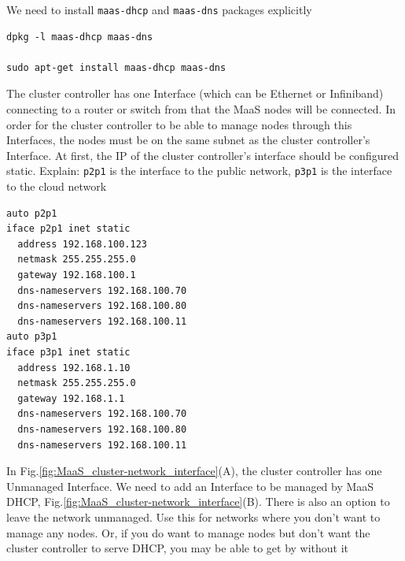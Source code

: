 We need to install \verb!maas-dhcp! and \verb!maas-dns! packages
explicitly
\begin{verbatim}
dpkg -l maas-dhcp maas-dns

sudo apt-get install maas-dhcp maas-dns
\end{verbatim}
The cluster controller has one Interface (which can be Ethernet or Infiniband)
connecting to a router or switch from that the MaaS nodes will be connected. In
order for the cluster controller to be able to manage nodes through this
Interfaces, the nodes must be on the same subnet as the cluster controller's
Interface. At first, the IP of the cluster controller's interface should be
configured static. Explain: \verb!p2p1! is the interface to the public network,
\verb!p3p1! is the interface to the cloud network 
\begin{verbatim}
auto p2p1
iface p2p1 inet static
  address 192.168.100.123
  netmask 255.255.255.0
  gateway 192.168.100.1
  dns-nameservers 192.168.100.70
  dns-nameservers 192.168.100.80
  dns-nameservers 192.168.100.11
auto p3p1
iface p3p1 inet static
  address 192.168.1.10
  netmask 255.255.255.0
  gateway 192.168.1.1
  dns-nameservers 192.168.100.70
  dns-nameservers 192.168.100.80
  dns-nameservers 192.168.100.11
\end{verbatim}

In Fig.\ref{fig:MaaS_cluster-network_interface}(A), the cluster controller has
one Unmanaged Interface. We need to add an Interface to be managed by MaaS
DHCP, Fig.\ref{fig:MaaS_cluster-network_interface}(B).
There is also an option to leave the network unmanaged. Use this for networks
where you don't want to manage any nodes. Or, if you do want to manage nodes but
don't want the cluster controller to serve DHCP, you may be able to get by
without it



